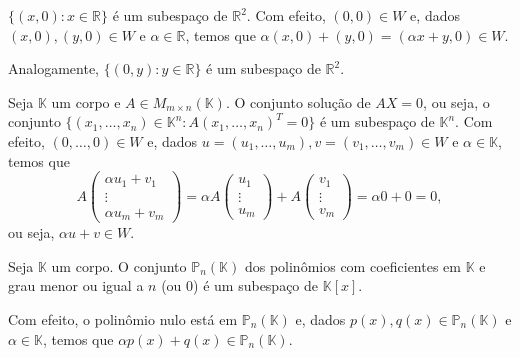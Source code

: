 \begin{example}
    $\{(x, 0): x \in \mathbb R\}$ é um subespaço de $\mathbb R^2$.
    Com efeito, $(0, 0) \in W$ e, dados $(x, 0), (y, 0) \in W$ e $\alpha \in \mathbb R$, temos que $\alpha(x, 0) + (y, 0) = (\alpha x + y, 0) \in W$.

    Analogamente, $\{(0, y): y \in \mathbb R\}$ é um subespaço de $\mathbb R^2$.
\end{example}

\begin{example}
    Seja $\mathbb K$ um corpo e $A \in M_{m \times n}(\mathbb K)$.
    O conjunto solução de $AX=0$, ou seja, o conjunto $\{(x_1, \dots, x_n) \in \mathbb K^n : A(x_1, \dots, x_n)^T = 0\}$ é um subespaço de $\mathbb K^n$.
    Com efeito, $(0, \dots, 0) \in W$ e, dados $u=(u_1, \dots, u_m), v=(v_1, \dots, v_m) \in W$ e $\alpha \in \mathbb K$, temos que
    \begin{equation}
        A\begin{pmatrix}
            \alpha u_1 + v_1 \\
            \vdots \\
            \alpha u_m + v_m   
        \end{pmatrix}
        = \alpha A\begin{pmatrix}
            u_1 \\
            \vdots \\
            u_m
        \end{pmatrix}
        + A\begin{pmatrix}
            v_1 \\
            \vdots \\
            v_m
        \end{pmatrix}
        = \alpha 0 + 0 = 0,
    \end{equation}
    ou seja, $\alpha u + v \in W$.
\end{example}

\begin{example}
    Seja $\mathbb K$ um corpo.
    O conjunto $\mathbb P_n(\mathbb K)$ dos polinômios com coeficientes em $\mathbb K$ e grau menor ou igual a $n$ (ou $0$) é um subespaço de $\mathbb K[x]$.

    Com efeito, o polinômio nulo está em $\mathbb P_n(\mathbb K)$ e, dados $p(x), q(x) \in \mathbb P_n(\mathbb K)$ e $\alpha \in \mathbb K$, temos que $\alpha p(x) + q(x) \in \mathbb P_n(\mathbb K)$.
\end{example}

